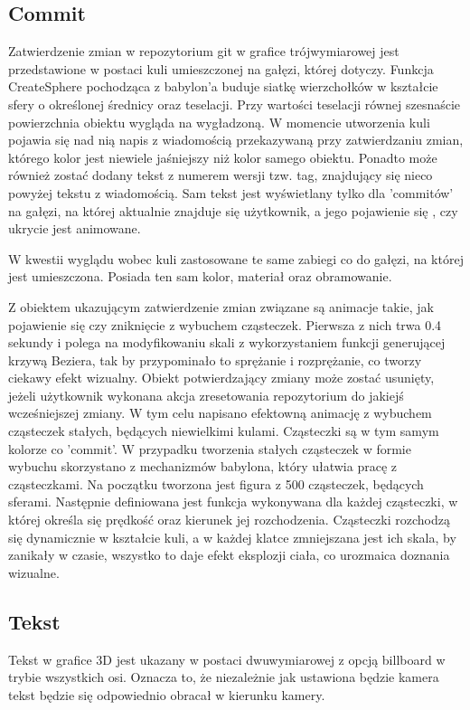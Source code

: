 \documentclass[11pt,a4paper,polish,thesis]{dcsbook}
\begin{document}
	\subsection{Commit}
	Zatwierdzenie zmian w repozytorium git w grafice trójwymiarowej jest przedstawione w postaci kuli umieszczonej na gałęzi, której dotyczy. Funkcja CreateSphere pochodząca z babylon'a buduje siatkę wierzchołków w kształcie sfery o określonej średnicy oraz teselacji. Przy wartości teselacji równej szesnaście powierzchnia obiektu wygląda na wygładzoną. W momencie utworzenia kuli  pojawia się nad nią napis z wiadomością przekazywaną przy zatwierdzaniu zmian, którego kolor jest niewiele jaśniejszy niż kolor samego obiektu. Ponadto może również zostać dodany tekst z numerem wersji tzw. tag, znajdujący się nieco powyżej tekstu z wiadomością. Sam tekst jest wyświetlany tylko dla 'commitów' na gałęzi, na której aktualnie znajduje się użytkownik, a jego pojawienie się , czy ukrycie jest animowane. 

	 W kwestii wyglądu wobec kuli zastosowane te same zabiegi co do gałęzi, na której jest umieszczona. Posiada ten sam kolor, materiał oraz obramowanie. 
 
	Z obiektem ukazującym zatwierdzenie zmian związane są animacje takie, jak pojawienie się czy zniknięcie z wybuchem cząsteczek. Pierwsza z nich trwa 0.4 sekundy i polega na modyfikowaniu skali z wykorzystaniem funkcji generującej krzywą Beziera, tak by przypominało to sprężanie i rozprężanie, co tworzy ciekawy efekt wizualny. Obiekt potwierdzający zmiany może zostać usunięty, jeżeli użytkownik wykonana akcja zresetowania repozytorium do jakiejś wcześniejszej zmiany. W tym celu napisano efektowną animację z wybuchem cząsteczek stałych, będących niewielkimi kulami. Cząsteczki są w tym samym kolorze co 'commit'. W przypadku tworzenia stałych cząsteczek w formie wybuchu skorzystano z mechanizmów babylona, który ułatwia pracę z cząsteczkami. Na początku tworzona jest figura z 500 cząsteczek, będących sferami. Następnie definiowana jest funkcja wykonywana dla każdej cząsteczki, w której określa się prędkość oraz kierunek jej rozchodzenia. Cząsteczki rozchodzą się dynamicznie w kształcie kuli, a w każdej klatce zmniejszana jest ich skala, by zanikały w czasie, wszystko to daje efekt eksplozji ciała, co urozmaica doznania wizualne. 
 
	\subsection{Tekst}
	Tekst w grafice 3D jest ukazany w postaci dwuwymiarowej z opcją billboard w trybie  wszystkich osi. Oznacza to, że niezależnie jak ustawiona będzie kamera tekst będzie się odpowiednio obracał w kierunku kamery. 
\end{document}
